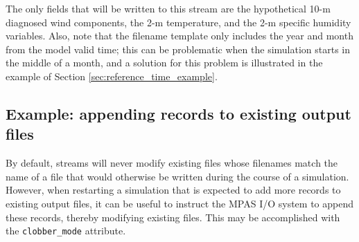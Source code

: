 \vspace{12pt}
 \newline
\hspace*{\mutindent}{\tt type="output"} \newline
\hspace*{\mutindent}{\tt filename\_template="diagnostics.\$Y-\$M.nc"} \newline
\hspace*{\mutindent}{\tt filename\_interval="01-00\_00:00:00"} \newline
\hspace*{\mutindent}{\tt precision="single"} \newline
\hspace*{\mutindent}{\tt output\_interval="6:00:00" />} \newline
\newline
\hspace*{1cm}{\tt <var name="u10"/>} \newline
\hspace*{1cm}{\tt <var name="v10"/>} \newline
\hspace*{1cm}{\tt <var name="t2"/>} \newline
\hspace*{1cm}{\tt <var name="q2"/>} \newline
\newline
{} \newline
\vspace{12pt}

The only fields that will be written to this stream are the hypothetical 10-m diagnosed wind components, the 2-m temperature, 
and the 2-m specific humidity variables. Also, note that the filename template only includes the year and month from the model 
valid time; this can be problematic when the simulation starts in the middle of a month, and a solution for this problem 
is illustrated in the example of Section \ref{sec:reference_time_example}.

\subsection{Example: appending records to existing output files}
\label{sec:append_example}

By default, streams will never modify existing files whose filenames match the name of a file that would otherwise be written
during the course of a simulation. However, when restarting a simulation that is expected to add more records to existing output 
files, it can be useful to instruct the MPAS I/O system to append these records, thereby modifying existing files. This may be 
accomplished with the {\tt clobber\_mode} attribute.

